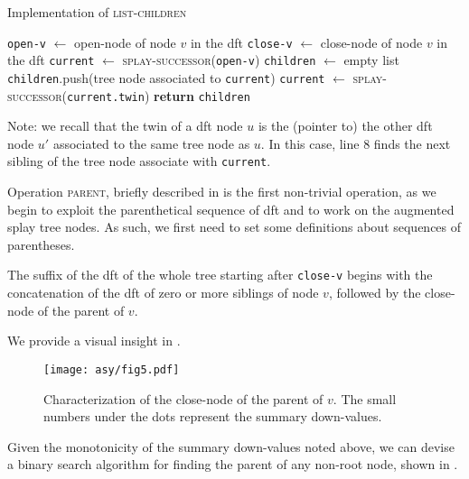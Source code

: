 \documentclass[a4paper,USenglish]{lipics}
\newcommand{\var}[1]{\textrm{\texttt{#1}}}
\begin{document}
		\begin{algorithm}[H]
		  \small
		  \caption{\small Implementation of \textsc{list-children}}
		  \label{algo:list children}
		  \begin{algorithmic}[1]
			    \State \var{open-v} $\gets$ open-node of node $v$ in the dft
				\State \var{close-v} $\gets$ close-node of node $v$ in the dft
			    \State \var{current} $\gets$ \textsc{splay-successor}(\var{open-v})
			    \State \var{children} $\gets$ empty list
			    \While{\var{current} $\neq$ \var{close-v}}
			    	\State \var{children}.push(tree node associated to \var{current})
			    	\State \var{current} $\gets$ \textsc{splay-successor}(\var{current.twin})
			    \EndWhile
			    \State \textbf{return} \var{children}
		    \EndProcedure
		  \end{algorithmic}
		  Note: we recall that the twin of a dft node $u$ is the (pointer to) the other dft node $u'$ associated to the same tree node as $u$. In this case, line 8 finds the next sibling of the tree node associate with \var{current}.
		\end{algorithm}	
		\vspace{2mm}
		
		Operation \textsc{parent}, briefly described in  is the first non-trivial operation, as we begin to exploit the parenthetical sequence of dft and to work on the augmented splay tree nodes. As such, we first need to set some definitions about sequences of parentheses. \begin{lemma}
			The suffix of the dft of the whole tree starting after \var{close-v} begins with the concatenation of the dft of zero or more siblings of node $v$, followed by the close-node of the parent of $v$. 
		\end{lemma}
		
		We provide a visual insight in .
		
		\begin{figure}[t]

\centering
			\texttt{[image: asy/fig5.pdf]}\\
			\caption{Characterization of the close-node of the parent of $v$. The small numbers under the dots represent the summary down-values.\label{fig:close father}}
		\end{figure}
		
		Given the monotonicity of the summary down-values noted above, we can devise a binary search algorithm for finding the parent of any non-root node, shown in .
\end{document}
